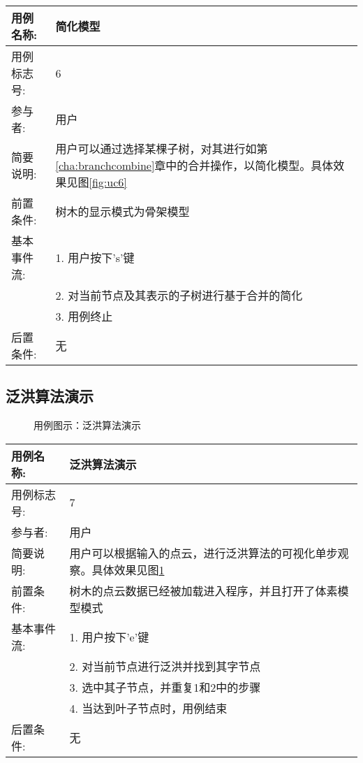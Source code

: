 \begin{table}[H]
	\centering
\begin{tabular}{|l|p{8cm}|}
	\hline
	用例名称: & 简化模型\\
	\hline
	用例标志号: & 6\\
	\hline
	参与者: & 用户\\
	\hline
	简要说明: & 用户可以通过选择某棵子树，对其进行如第\ref{cha:branchcombine}章中的合并操作，以简化模型。具体效果见图\ref{fig:uc6}\\
	\hline
	前置条件: & 树木的显示模式为骨架模型\\
	\hline
	基本事件流: & 1. 用户按下's'键\\
	 & 2. 对当前节点及其表示的子树进行基于合并的简化\\
	 & 3. 用例终止\\
	\hline
	后置条件: & 无\\
	\hline
\end{tabular}
\end{table}

\clearpage
\subsection{泛洪算法演示}
\begin{figure}[H]
	\centering
	\hfill
	\hfill
	\hfill
	\hfill
	\hfill
	\caption{用例图示：泛洪算法演示}
	\label{fig:uc7}
\end{figure}

\begin{table}[H]
	\centering
\begin{tabular}{|l|p{8cm}|}
	\hline
	用例名称: & 泛洪算法演示\\
	\hline
	用例标志号: & 7\\
	\hline
	参与者: & 用户\\
	\hline
	简要说明: & 用户可以根据输入的点云，进行泛洪算法的可视化单步观察。具体效果见图\ref{fig:uc7}\\
	\hline
	前置条件: & 树木的点云数据已经被加载进入程序，并且打开了体素模型模式\\
	\hline
	基本事件流: & 1. 用户按下'e'键\\
	 & 2. 对当前节点进行泛洪并找到其字节点\\
	 & 3. 选中其子节点，并重复1和2中的步骤\\
	 & 4. 当达到叶子节点时，用例结束\\
	\hline
	后置条件: & 无\\
	\hline
\end{tabular}
\end{table}

